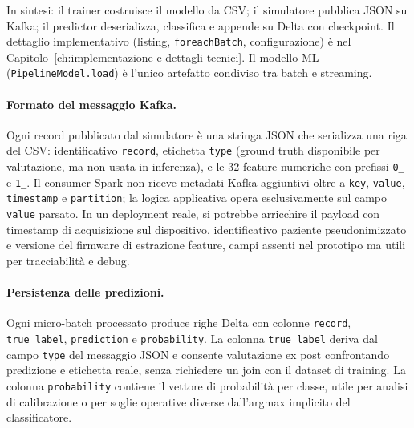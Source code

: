 In sintesi: il trainer costruisce il modello da CSV; il simulatore pubblica JSON su Kafka; il predictor deserializza, classifica e appende su Delta con checkpoint.
Il dettaglio implementativo (listing, \texttt{foreachBatch}, configurazione) è nel Capitolo~\ref{ch:implementazione-e-dettagli-tecnici}.
Il modello ML (\texttt{PipelineModel.load}) è l'unico artefatto condiviso tra batch e streaming.

\paragraph{Formato del messaggio Kafka.}
Ogni record pubblicato dal simulatore è una stringa JSON che serializza una riga del CSV: identificativo \texttt{record}, etichetta \texttt{type} (ground truth disponibile per valutazione, ma non usata in inferenza), e le 32 feature numeriche con prefissi \texttt{0\_} e \texttt{1\_}.
Il consumer Spark non riceve metadati Kafka aggiuntivi oltre a \texttt{key}, \texttt{value}, \texttt{timestamp} e \texttt{partition}; la logica applicativa opera esclusivamente sul campo \texttt{value} parsato.
In un deployment reale, si potrebbe arricchire il payload con timestamp di acquisizione sul dispositivo, identificativo paziente pseudonimizzato e versione del firmware di estrazione feature, campi assenti nel prototipo ma utili per tracciabilità e debug.

\paragraph{Persistenza delle predizioni.}
Ogni micro-batch processato produce righe Delta con colonne \texttt{record}, \texttt{true\_label}, \texttt{prediction} e \texttt{probability}.
La colonna \texttt{true\_label} deriva dal campo \texttt{type} del messaggio JSON e consente valutazione ex post confrontando predizione e etichetta reale, senza richiedere un join con il dataset di training.
La colonna \texttt{probability} contiene il vettore di probabilità per classe, utile per analisi di calibrazione o per soglie operative diverse dall'argmax implicito del classificatore.

